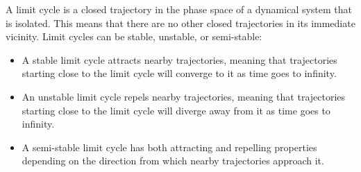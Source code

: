 \documentclass[11pt]{article}
\begin{document}
\begin{definition}
    A limit cycle is a closed trajectory in the phase space of a dynamical system that is isolated. This means that there are no other closed trajectories in its immediate vicinity. Limit cycles can be stable, unstable, or semi-stable:
    \begin{itemize}
        \item A stable limit cycle attracts nearby trajectories, meaning that trajectories starting close to the limit cycle will converge to it as time goes to infinity.
        \item An unstable limit cycle repels nearby trajectories, meaning that trajectories starting close to the limit cycle will diverge away from it as time goes to infinity.
        \item A semi-stable limit cycle has both attracting and repelling properties depending on the direction from which nearby trajectories approach it.
    \end{itemize}
    
\end{definition}
\end{document}
